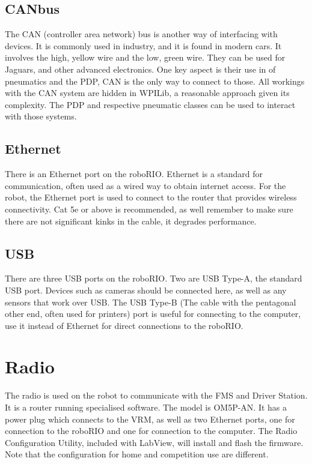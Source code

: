 \documentclass[]{report}
\begin{document}
\subsection{CANbus}
The CAN (controller area network) bus is another way of interfacing with devices.
It is commonly used in industry, and it is found in modern cars.
It involves the high, yellow wire and the low, green wire.
They can be used for Jaguars, and other advanced electronics.
One key aspect is their use in of pneumatics and the PDP,  CAN is the only way to connect to those.
All workings with the CAN system are hidden in WPILib, a reasonable approach given its complexity.
The PDP and respective pneumatic classes can be used to interact with those systems.

\subsection{Ethernet}
There is an Ethernet port on the roboRIO.
Ethernet is a standard for communication, often used as a wired way to obtain internet access.
For the robot, the Ethernet port is used to connect to the router that provides wireless connectivity.
Cat 5e or above is recommended, as well remember to make sure there are not significant kinks in the cable, it degrades performance.

\subsection{USB}
	There are three USB ports on the roboRIO.
	Two are USB Type-A, the standard USB port.
	Devices such as cameras should be connected here, as well as any sensors that work over USB.
	\newline
	The USB Type-B (The cable with the pentagonal other end, often used for printers) port is useful for connecting to the computer, use it instead of Ethernet for direct connections to the roboRIO.

\section{Radio}
	The radio is used on the robot to communicate with the FMS and Driver Station. It is a router running specialised software.
	The model is OM5P-AN.
	It has a power plug which connects to the VRM, as well as two Ethernet ports, one for connection to the roboRIO and one for connection to the computer.
	 The Radio Configuration Utility, included with LabView, will install and flash the firmware.
	 Note that the configuration for home and competition use are different.
\end{document}
